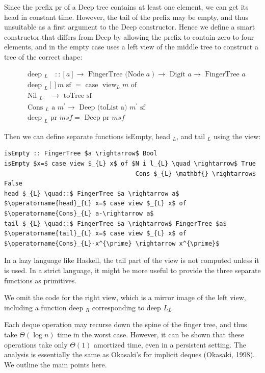 \documentclass[10pt]{article}
\begin{document}
Since the prefix pr of a Deep tree contains at least one element, we can get its head in constant time. However, the tail of the prefix may be empty, and thus unsuitable as a first argument to the Deep constructor. Hence we define a smart constructor that differs from Deep by allowing the prefix to contain zero to four elements, and in the empty case uses a left view of the middle tree to construct a tree of the correct shape:

$$
\begin{aligned}
& \text { deep } \left._{L} \quad::[a] \rightarrow \text { FingerTree (Node } a\right) \rightarrow \text { Digit } a \rightarrow \text { FingerTree } a \\
& \text { deep }_{L}[] m \text { sf }=\text { case } \operatorname{view}_{L} m \text { of } \\
& \text { Nil }_{L} \quad \rightarrow \text { toTree sf } \\
& \text { Cons }_{L} \text { a } m^{\prime} \rightarrow \text { Deep (toList a) } m^{\prime} \text { sf } \\
& \text { deep }_{L} \text { pr } m s f=\text { Deep pr } m s f
\end{aligned}
$$

Then we can define separate functions isEmpty, head $_{L}$, and tail $_{L}$ using the view:

\begin{verbatim}
isEmpty :: FingerTree $a \rightarrow$ Bool
isEmpty $x=$ case view $_{L} x$ of $N i l_{L} \quad \rightarrow$ True
                                    Cons $_{L}-\mathbf{} \rightarrow$ False
head $_{L} \quad::$ FingerTree $a \rightarrow a$
$\operatorname{head}_{L} x=$ case view $_{L} x$ of $\operatorname{Cons}_{L} a-\rightarrow a$
tail $_{L} \quad::$ FingerTree $a \rightarrow$ FingerTree $a$
$\operatorname{tail}_{L} x=$ case view $_{L} x$ of $\operatorname{Cons}_{L}-x^{\prime} \rightarrow x^{\prime}$
\end{verbatim}

In a lazy language like Haskell, the tail part of the view is not computed unless it is used. In a strict language, it might be more useful to provide the three separate functions as primitives.

We omit the code for the right view, which is a mirror image of the left view, including a function deep $_{R}$ corresponding to deep $L_{L}$.

Each deque operation may recurse down the spine of the finger tree, and thus take $\Theta(\log n)$ time in the worst case. However, it can be shown that these operations take only $\Theta(1)$ amortized time, even in a persistent setting. The analysis is essentially the same as Okasaki's for implicit deques (Okasaki, 1998). We outline the main points here.
\end{document}
